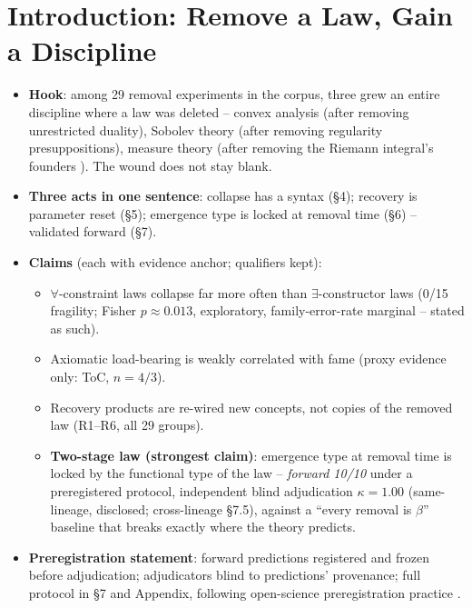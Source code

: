 \documentclass[11pt]{article}
\begin{document}
\section{Introduction: Remove a Law, Gain a Discipline}\label{sec:intro}
\begin{itemize}
  \item \textbf{Hook}: among 29 removal experiments in the corpus,
        three grew an entire discipline where a law was deleted --
        convex analysis (after removing unrestricted duality), Sobolev
        theory (after removing regularity presuppositions), measure
        theory (after removing the Riemann integral's founders
        \citealp{hawkins1975lebesgue}). The
        wound does not stay blank.
  \item \textbf{Three acts in one sentence}: collapse has a syntax
        (§4); recovery is parameter reset (§5); emergence type is locked
        at removal time (§6) -- validated forward (§7).
  \item \textbf{Claims} (each with evidence anchor; qualifiers kept):
        \begin{itemize}
          \item[C1] $\forall$-constraint laws collapse far more often
                than $\exists$-constructor laws (0/15 fragility;
                Fisher $p\approx0.013$, exploratory, family-error-rate
                marginal -- stated as such).
          \item[C2] Axiomatic load-bearing is weakly correlated with
                fame (proxy evidence only: ToC, $n=4/3$).
          \item[C3] Recovery products are re-wired new concepts, not
                copies of the removed law (R1--R6, all 29 groups).
          \item[C4] \textbf{Two-stage law (strongest claim)}: emergence
                type at removal time is locked by the functional type of
                the law -- \emph{forward 10/10} under a preregistered
                protocol, independent blind adjudication
                $\kappa=1.00$ (same-lineage, disclosed; cross-lineage
                §7.5), against a ``every removal is $\beta$'' baseline
                that breaks exactly where the theory predicts.
        \end{itemize}
  \item \textbf{Preregistration statement}: forward predictions
        registered and frozen before adjudication; adjudicators blind
        to predictions' provenance; full protocol in §7 and Appendix,
        following open-science preregistration practice
        \citep{nosek2018preregistration}.
\end{itemize}
\end{document}
